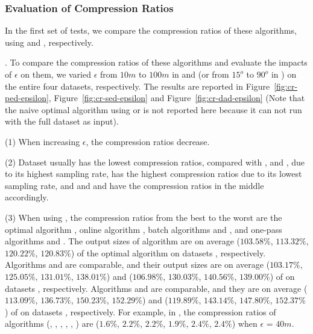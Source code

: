 \vspace{-1ex}
\subsubsection{Evaluation of Compression Ratios}

In the first set of tests, we compare the compression ratios of these algorithms, using \ped and \sed, respectively.

.
To compare the compression ratios of these algorithms and evaluate the impacts of $\epsilon$ on them, we varied $\epsilon$ from $10m$ to $100m$ in \ped and \sed (or from $15^o$ to $90^o$ in \dad) on the entire four datasets, respectively.
The results are reported in Figure~\ref{fig:cr-ped-epsilon}, Figure~\ref{fig:cr-sed-epsilon} and Figure~\ref{fig:cr-dad-epsilon} ({Note that the naive optimal algorithm using \sed or \dad is not reported here because it can not run with the full dataset as input}).


\sstab (1) When increasing $\epsilon$, the compression ratios decrease.

\sstab (2) Dataset \mopsi usually has the lowest compression ratios, compared with \taxi, \ucar and \geolife, due to its highest sampling rate, \taxi has the highest compression ratios due to its lowest sampling rate, and \ucar and \geolife and  have the compression ratios in the middle accordingly.

\sstab (3) When using \ped, the compression ratios from the best
to the worst are the optimal algorithm \opt, online algorithm \bqsa, batch algorithms \tpa and
\dpa, and one-pass algorithms \siped and \operb.
The output sizes of algorithm \bqsa are on average
($103.58\%$, $113.32\%$, $120.22\%$, $120.83\%$) of the optimal algorithm \opt
on datasets \dSets, respectively.
Algorithms \tpa and \dpa are comparable, and their output sizes are on average
($103.17\%$, $125.05\%$, $131.01\%$, $138.01\%$) and ($106.98\%$, $130.03\%$, $140.56\%$, $139.00\%$) of \opt
on datasets \dSets, respectively.
Algorithms \siped and \operb are comparable, and they are on average
($113.09\%$, $136.73\%$, $150.23\%$, $152.29\%$)
and ($119.89\%$, $143.14\%$, $147.80\%$, $152.37\%$) of \opt on datasets \dSets, respectively.
%
For example, in \mopsi, the compression ratios of algorithms
(\opt, \tpa, \dpa, \bqsa, \siped, \operb ) are ($1.6\%$, $2.2\%$, $2.2\%$, $1.9\%$, $2.4\%$, $2.4\%$) when $\epsilon$ = $40m$.

